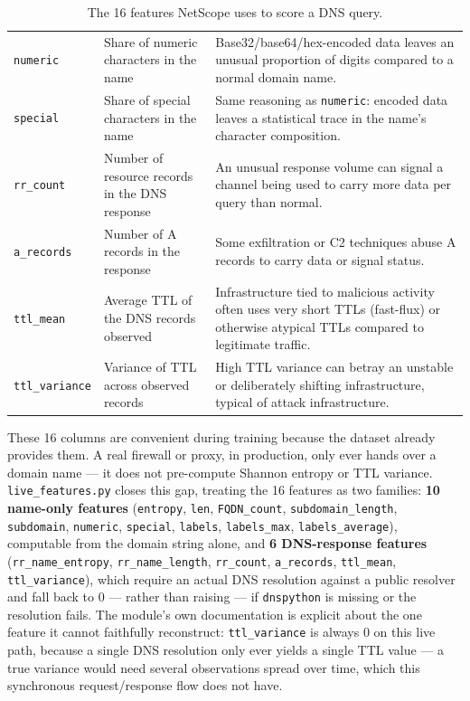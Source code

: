 \begin{table}[h]
\begin{tabular}{@{}p{3cm}p{4.8cm}p{5.5cm}@{}}
\texttt{numeric} &
Share of numeric characters in the name &
Base32/base64/hex-encoded data leaves an unusual proportion of digits
compared to a normal domain name. \\

\texttt{special} &
Share of special characters in the name &
Same reasoning as \texttt{numeric}: encoded data leaves a statistical trace
in the name's character composition. \\

\texttt{rr\_count} &
Number of resource records in the DNS response &
An unusual response volume can signal a channel being used to carry more
data per query than normal. \\

\texttt{a\_records} &
Number of A records in the response &
Some exfiltration or C2 techniques abuse A records to carry data or signal
status. \\

\texttt{ttl\_mean} &
Average TTL of the DNS records observed &
Infrastructure tied to malicious activity often uses very short TTLs
(fast-flux) or otherwise atypical TTLs compared to legitimate traffic. \\

\texttt{ttl\_variance} &
Variance of TTL across observed records &
High TTL variance can betray an unstable or deliberately shifting
infrastructure, typical of attack infrastructure. \\
\bottomrule
\end{tabular}
\caption{The 16 features NetScope uses to score a DNS query.}
\end{table}

These 16 columns are convenient during training because the dataset already
provides them. A real firewall or proxy, in production, only ever hands
over a domain name --- it does not pre-compute Shannon entropy or TTL
variance. \texttt{live\_features.py} closes this gap, treating the 16
features as two families: \textbf{10 name-only features}
(\texttt{entropy}, \texttt{len}, \texttt{FQDN\_count},
\texttt{subdomain\_length}, \texttt{subdomain}, \texttt{numeric},
\texttt{special}, \texttt{labels}, \texttt{labels\_max},
\texttt{labels\_average}), computable from the domain string alone, and
\textbf{6 DNS-response features} (\texttt{rr\_name\_entropy},
\texttt{rr\_name\_length}, \texttt{rr\_count}, \texttt{a\_records},
\texttt{ttl\_mean}, \texttt{ttl\_variance}), which require an actual DNS
resolution against a public resolver and fall back to 0 --- rather than
raising --- if \texttt{dnspython} is missing or the resolution fails.
The module's own documentation is explicit about the one feature it cannot
faithfully reconstruct: \texttt{ttl\_variance} is always 0 on this live
path, because a single DNS resolution only ever yields a single TTL value
--- a true variance would need several observations spread over time, which
this synchronous request/response flow does not have.

